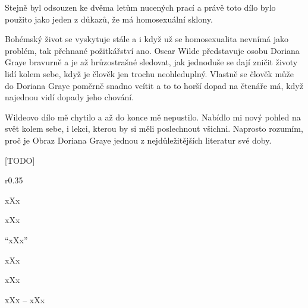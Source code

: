 \documentclass{extarticle} %
\begin{document}
\noindent
Stejně byl odsouzen ke dvěma letům nucených prací a právě toto dílo bylo použito jako jeden z důkazů, že má homosexuální sklony.

\noindent
Bohémský život se vyskytuje stále a i když už se homosexualita nevnímá jako problém, tak přehnané požitkářství ano.
Oscar Wilde představuje osobu Doriana Graye bravurně a je až hrůzostrašné sledovat, jak jednoduše se dají zničit životy lidí kolem sebe, když je člověk jen trochu neohleduplný.
Vlastně se člověk může do Doriana Graye poměrně snadno vcítit a to to horší dopad na čtenáře má, když najednou vidí dopady jeho chování.

\noindent 
Wildeovo dílo mě chytilo a až do konce mě nepustilo.
Nabídlo mi nový pohled na svět kolem sebe, i lekci, kterou by si měli poslechnout všichni.
Naprosto rozumím, proč je Obraz Doriana Graye jednou z nejdůležitějších literatur své doby.

\vfill


\newpage


\changefontsize{8pt}

[TODO]

\noindent\begin{wrapfigure}{r}{0.35\textwidth}
\tiny

\setlength{\parindent}{3pt}
xXx
\end{wrapfigure}


\noindent xXx



\noindent 
\enquote{xXx}

\noindent 
xXx

\noindent 
xXx

\noindent 
\textsc{xXx --} xXx \\
\end{document}
